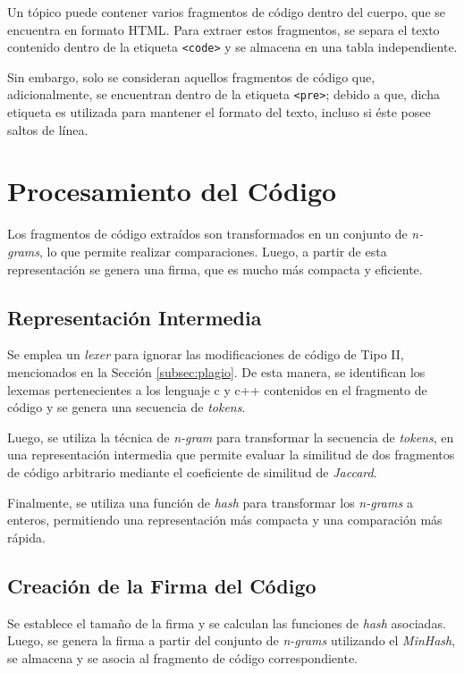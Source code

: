 Un tópico %
puede contener varios fragmentos de código dentro del cuerpo,
que se encuentra en formato \ac{HTML}.
Para extraer estos fragmentos,
se separa el texto contenido dentro de la etiqueta \lstinline{<code>}
y se almacena en una tabla independiente. 

Sin embargo, solo se consideran aquellos fragmentos de código que,
adicionalmente, se encuentran dentro de la etiqueta \lstinline{<pre>};
debido a que, dicha etiqueta es utilizada para mantener
el formato del texto, incluso si éste posee saltos de línea.

\section{Procesamiento del Código}
\label{sec:MedProcCod}

Los fragmentos de código extraídos son transformados en un conjunto de
\textit{n-grams}, lo que permite realizar comparaciones. Luego, 
a partir de esta representación se genera una firma,
que es mucho más compacta y eficiente.

\subsection{Representación Intermedia}
\label{subsec:MedRepInt}

Se emplea un \textit{lexer} para ignorar las modificaciones
de código de Tipo II, mencionados en la Sección \ref{subsec:plagio}.
De esta manera, se identifican los lexemas pertenecientes a los lenguaje c y c++ contenidos en 
el fragmento de código y se genera una secuencia de \textit{tokens}.

Luego, se utiliza la técnica de \textit{n-gram} para transformar la secuencia
de \textit{tokens}, en una representación intermedia que permite evaluar 
la similitud de dos fragmentos de código arbitrario mediante el coeficiente
de similitud de \textit{Jaccard}.

Finalmente, se utiliza una función de \textit{hash} para transformar los
\textit{n-grams} a enteros, permitiendo una representación más compacta
y una comparación más rápida.

\subsection{Creación de la Firma del Código}
\label{subsec:MedFirCod}

Se establece el tamaño de la firma y se calculan las funciones de \textit{hash}
asociadas. Luego, se genera la firma a partir del conjunto de \textit{n-grams}
utilizando el \textit{MinHash}, se almacena y se asocia al fragmento de código
correspondiente.%

